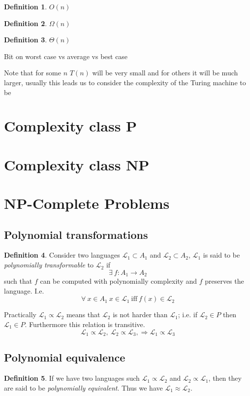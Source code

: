 \documentclass{article}
\theoremstyle{definition}
\newtheorem{definition}{Definition}[section]
\begin{document}
\begin{definition}
	$O(n)$
\end{definition}

\begin{definition}
	$\Omega(n)$
\end{definition}

\begin{definition}
	$\Theta(n)$
\end{definition}
Bit on worst case vs average vs best case

Note that for some $n$ $T(n)$ will be very small and for others it will be much larger,
usually this leads us to consider the complexity of the Turing machine to be 


\section{Complexity class P}

\section{Complexity class NP}

\section{NP-Complete Problems}

\subsection{Polynomial transformations}
\begin{definition}
	Consider two languages $\mathcal{L_1} \subset A_1$ and $\mathcal{L_2} \subset A_2$,
	$\mathcal{L_1}$ is said to be \textit{polynomially transformable} to $\mathcal{L_2}$ if
	$$\exists\ f : A_1 \rightarrow A_2$$
	such that $f$ can be computed with polynomially complexity and $f$ preserves the language. I.e.
	$$\forall\ x \in A_1\ x \in \mathcal{L_1}\ \mathrm{iff}\ f(x)\in \mathcal{L_2}$$
\end{definition}

Practically $\mathcal{L_1} \propto \mathcal{L_2}$ means that
$\mathcal{L_2}$ is not harder than $\mathcal{L_1}$;
i.e. if $\mathcal{L_2} \in P$ then $\mathcal{L_1} \in P$.
Furthermore this relation is transitive.
$$
  \mathcal{L_1} \propto \mathcal{L_2},\ 
  \mathcal{L_2} \propto \mathcal{L_3},\Rightarrow
  \mathcal{L_1} \propto \mathcal{L_3}
$$

\subsection{Polynomial equivalence}
\begin{definition}
	If we have two languages such $\mathcal{L_1} \propto \mathcal{L_2}$ and
	$\mathcal{L_2} \propto \mathcal{L_1}$, then they are said to be \textit{polynomially equivalent}.
	Thus we have $\mathcal{L_1} \approx \mathcal{L_2}$.
\end{definition}
\end{document}
